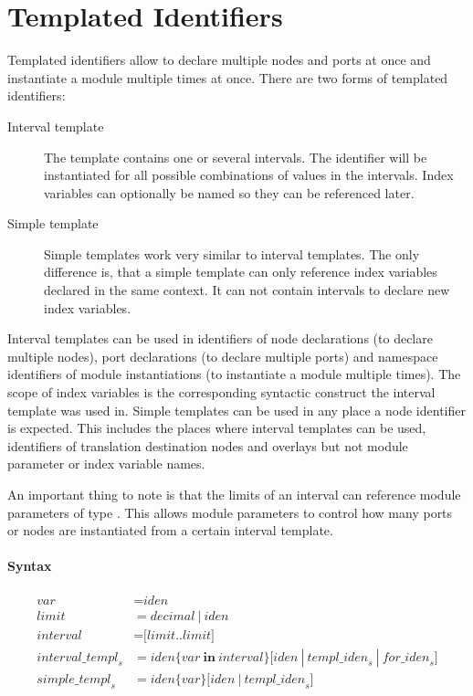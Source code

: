 \documentclass[a4paper,11pt,twoside]{report}
\begin{document}
{{{\section{Templated Identifiers}
\label{sec:template_idens}
Templated identifiers allow to declare multiple nodes and ports at once and instantiate a module multiple times at once.
There are two forms of templated identifiers:
\begin{description}
    \item[Interval template]
        The template contains one or several intervals.
        The identifier will be instantiated for all possible combinations of values in the intervals.
        Index variables can optionally be named so they can be referenced later.
    \item[Simple template]
        Simple templates work very similar to interval templates.
        The only difference is, that a simple template can only reference index variables declared in the same context.
        It can not contain intervals to declare new index variables.
\end{description}

Interval templates can be used in identifiers of node declarations (to declare multiple nodes), port declarations (to declare multiple ports) and namespace identifiers of module instantiations (to instantiate a module multiple times).
The scope of index variables is the corresponding syntactic construct the interval template was used in.
Simple templates can be used in any place a node identifier is expected.
This includes the places where interval templates can be used, identifiers of translation destination nodes and overlays but not module parameter or index variable names.

An important thing to note is that the limits of an interval can reference module parameters of type .
This allows module parameters to control how many ports or nodes are instantiated from a certain interval template.

\paragraph{Syntax}
\begin{align*}
    \textit{var} & \mathop{=}
        \textit{iden}\\
    \textit{limit} & \mathop{=}
        \textit{decimal}\ |\ \textit{iden} \\
    \textit{interval} & \mathop{=}
        \textbf{[}\textit{limit}\textbf{..}\textit{limit}\textbf{]}\\
    \textit{interval\_templ}_s & \mathop{=}
        \textit{iden}\textbf{\{}\textit{var}\ \textbf{in}\ \textit{interval}\textbf{\}}
        \Big[
            \textit{iden}\ |\ \textit{templ\_iden}_s\ |\ \textit{for\_iden}_s
        \Big]\\
    \textit{simple\_templ}_s & \mathop{=}
        \textit{iden}\textbf{\{}\textit{var}\textbf{\}}\Big[\textit{iden}\ |\ \textit{templ\_iden}_s\Big]\\
\end{align*}

}}}
\end{document}
